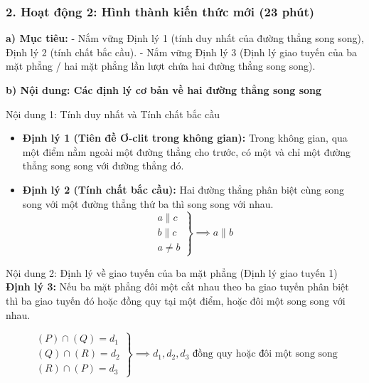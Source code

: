 \documentclass[12pt, a4paper]{article}
\begin{document}
\subsubsection*{2. Hoạt động 2: Hình thành kiến thức mới (23 phút)}

\noindent \textbf{a) Mục tiêu:}
- Nắm vững Định lý 1 (tính duy nhất của đường thẳng song song), Định lý 2 (tính chất bắc cầu).
- Nắm vững Định lý 3 (Định lý giao tuyến của ba mặt phẳng / hai mặt phẳng lần lượt chứa hai đường thẳng song song).

\noindent \textbf{b) Nội dung: Các định lý cơ bản về hai đường thẳng song song}
\begin{pedabox}{Nội dung 1: Tính duy nhất và Tính chất bắc cầu}
\begin{itemize}[leftmargin=0.6cm]
    \item \textbf{Định lý 1 (Tiên đề Ơ-clit trong không gian):} Trong không gian, qua một điểm nằm ngoài một đường thẳng cho trước, có một và chỉ một đường thẳng song song với đường thẳng đó.
    \item \textbf{Định lý 2 (Tính chất bắc cầu):} Hai đường thẳng phân biệt cùng song song với một đường thẳng thứ ba thì song song với nhau.
    $$\left.\begin{array}{l} a \parallel c \\ b \parallel c \\ a \neq b \end{array}\right\} \implies a \parallel b$$
\end{itemize}
\end{pedabox}

\begin{pedabox}{Nội dung 2: Định lý về giao tuyến của ba mặt phẳng (Định lý giao tuyến 1)}
\textbf{Định lý 3:} Nếu ba mặt phẳng đôi một cắt nhau theo ba giao tuyến phân biệt thì ba giao tuyến đó hoặc đồng quy tại một điểm, hoặc đôi một song song với nhau.
\begin{center}
\end{center}
$$\left.\begin{array}{l} (P) \cap (Q) = d_1 \\ (Q) \cap (R) = d_2 \\ (R) \cap (P) = d_3 \end{array}\right\} \implies d_1, d_2, d_3 \text{ đồng quy hoặc đôi một song song}$$
\end{pedabox}
\end{document}
